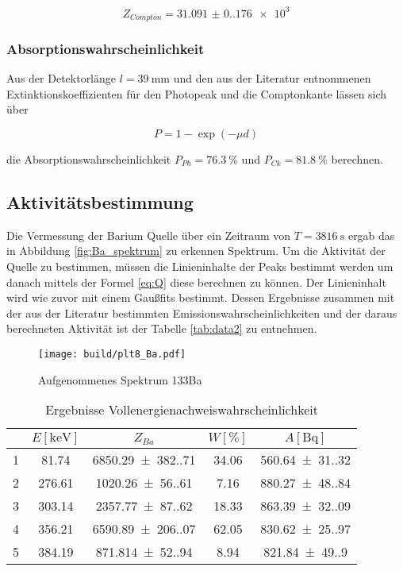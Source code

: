 \begin{equation*}
	Z_{Compton}=\num{31.091(0.176)e3}
\end{equation*}

\subsubsection{Absorptionswahrscheinlichkeit}
Aus der Detektorlänge $l=\qty{39}{\milli\meter}$ und 
den aus der Literatur \cite{web:nist} entnommenen Extinktionskoeffizienten für den Photopeak und die Comptonkante lässen sich über 

\begin{equation}
	P=1-\exp(-\mu d)
	\label{eq:Absorption}
\end{equation}

die Absorptionswahrscheinlichkeit $P_{Ph}=\qty{76.3}{\%}$ und $P_{Ck}=\qty{81.8}{\%}$ berechnen.

\subsection{Aktivitätsbestimmung}
Die Vermessung der Barium Quelle über ein Zeitraum von $T=\qty{3816}{\second}$ ergab das in Abbildung \eqref{fig:Ba_spektrum} zu erkennen Spektrum. 
Um die Aktivität der Quelle zu bestimmen, müssen die Linieninhalte der Peaks bestimmt werden um danach mittels der Formel \eqref{eq:Q} diese berechnen zu können. 
Der Linieninhalt wird wie zuvor mit einem Gaußfits bestimmt. 
Dessen Ergebnisse zusammen mit der aus der Literatur \cite{web:nuclear} bestimmten Emissionswahrscheinlichkeiten und 
der daraus berechneten Aktivität ist der Tabelle \eqref{tab:data2} zu entnehmen. 

\begin{figure}[H]
	\centering
	\texttt{[image: build/plt8\_Ba.pdf]}
	\caption{Aufgenommenes Spektrum 133Ba}
	\label{fig:Ba_spektrum}
\end{figure}

\begin{table}[H]
	\centering
	\caption{Ergebnisse Vollenergienachweiswahrscheinlichkeit}
	\begin{tabular}{c c c c c}
		\toprule
		\text{Peak} & $ E [\unit{\kilo\eV}] $ & $ Z_{Ba} $    & $ W [\%] $ & $ A [\unit{\becquerel}] $         \\
		\midrule
		1           & \num{81.74}   &  \num{6850.29(382.71)}  & \num{34.06} & \num{560.64(31.32)} \\
		2           & \num{276.61}  &  \num{1020.26(56.61)}   & \num{7.16}  & \num{880.27(48.84)} \\
		3           & \num{303.14}  &  \num{2357.77(87.62)}   & \num{18.33} & \num{863.39(32.09)} \\
		4           & \num{356.21}  &  \num{6590.89(206.07)}  & \num{62.05} & \num{830.62(25.97)} \\
		5           & \num{384.19}  &  \num{871.814(52.94)}   & \num{8.94}  & \num{821.84(49.90)} \\
		\bottomrule
	\end{tabular}
	\label{tab:data2}
\end{table}

